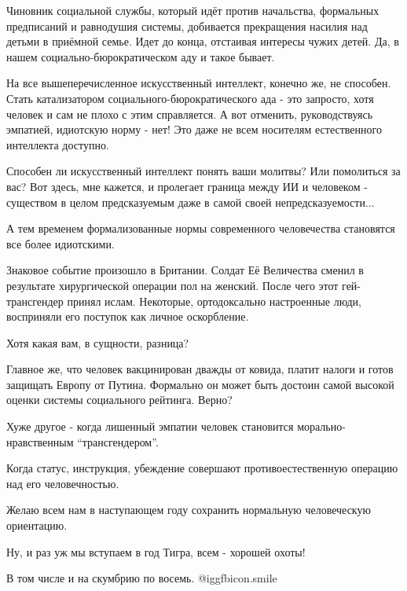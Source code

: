 Чиновник социальной службы, который идёт против начальства, формальных
предписаний и равнодушия системы, добивается прекращения насилия над детьми в
приёмной семье. Идет до конца, отстаивая интересы чужих детей. Да, в нашем
социально-бюрократическом аду и такое бывает.

На все вышеперечисленное искусственный интеллект, конечно же, не способен.
Стать катализатором социального-бюрократического ада - это запросто, хотя
человек и сам не плохо с этим справляется. А вот отменить, руководствуясь
эмпатией, идиотскую норму - нет! Это даже не всем носителям естественного
интеллекта доступно.

Способен ли искусственный интеллект понять ваши молитвы?  Или помолиться за
вас? Вот здесь, мне кажется, и пролегает граница между ИИ и человеком -
существом в целом предсказуемым даже в самой своей непредсказуемости...

А тем временем формализованные нормы современного человечества становятся все
более идиотскими. 

Знаковое событие  произошло в Британии. Солдат Её Величества сменил в
результате хирургической  операции пол на женский. После чего этот
гей-трансгендер принял ислам. Некоторые, ортодоксально настроенные люди,
восприняли его поступок как личное оскорбление.

Хотя какая вам, в сущности, разница?

Главное же, что человек вакцинирован дважды от ковида, платит налоги и готов
защищать Европу от Путина. Формально он может быть достоин самой высокой
оценки системы социального рейтинга. Верно?

Хуже другое -  когда лишенный эмпатии человек становится морально-нравственным
\enquote{трансгендером}. 

Когда статус, инструкция, убеждение совершают противоестественную операцию над
его человечностью. 

Желаю всем нам в наступающем году сохранить нормальную человеческую ориентацию.

Ну, и раз уж мы вступаем в год Тигра, всем  - хорошей охоты!

В том числе и на скумбрию по восемь.  @igg{fbicon.smile} 

